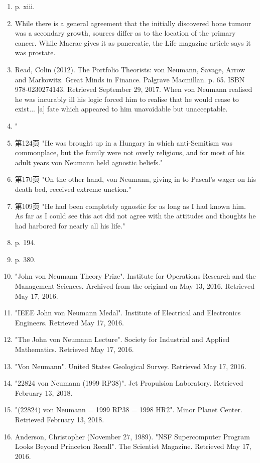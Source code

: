 \begin{enumerate}
\item  p. xiii.
\item While there is a general agreement that the initially discovered bone tumour was a secondary growth, sources differ as to the location of the primary cancer. While Macrae gives it as pancreatic, the Life magazine article says it was prostate.
\item Read, Colin (2012). The Portfolio Theorists: von Neumann, Savage, Arrow and Markowitz. Great Minds in Finance. Palgrave Macmillan. p. 65. ISBN 978-0230274143. Retrieved September 29, 2017. When von Neumann realised he was incurably ill his logic forced him to realise that he would cease to exist... [a] fate which appeared to him unavoidable but unacceptable.
\item "
\item 第124页 "He was brought up in a Hungary in which anti-Semitism was commonplace, but the family were not overly religious, and for most of his adult years von Neumann held agnostic beliefs."
\item 第170页 "On the other hand, von Neumann, giving in to Pascal's wager on his death bed, received extreme unction."
\item 第109页 "He had been completely agnostic for as long as I had known him. As far as I could see this act did not agree with the attitudes and thoughts he had harbored for nearly all his life."
\item  p. 194.
\item  p. 380.
\item "John von Neumann Theory Prize". Institute for Operations Research and the Management Sciences. Archived from the original on May 13, 2016. Retrieved May 17, 2016.
\item "IEEE John von Neumann Medal". Institute of Electrical and Electronics Engineers. Retrieved May 17, 2016.
\item "The John von Neumann Lecture". Society for Industrial and Applied Mathematics. Retrieved May 17, 2016.
\item "Von Neumann". United States Geological Survey. Retrieved May 17, 2016.
\item "22824 von Neumann (1999 RP38)". Jet Propulsion Laboratory. Retrieved February 13, 2018.
\item "(22824) von Neumann = 1999 RP38 = 1998 HR2". Minor Planet Center. Retrieved February 13, 2018.
\item Anderson, Christopher (November 27, 1989). "NSF Supercomputer Program Looks Beyond Princeton Recall". The Scientist Magazine. Retrieved May 17, 2016.

\end{enumerate}
